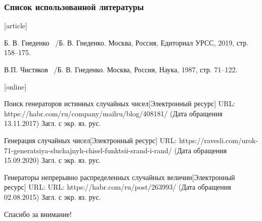 \documentclass{beamer}
\begin{document}
\begin{frame}[t]
\frametitle{Список использованной литературы}
\tiny
\begin{thebibliography}{9}
[article]

{Б. В. Гнеденко}
~/Б. В. Гнеденко.
\newblock Москва, Россия, Едиториал УРСС, 2019, стр. 158--175.

{В.П. Чистяков}
~/Б. В. Гнеденко.
\newblock Москва, Россия, Наука, 1987, стр. 71--122.

[online]

{Поиск генераторов истинных случайных чисел[Электронный ресурс]}
\newblock URL: https://habr.com/ru/company/mailru/blog/408181/
\newblock (Дата обращения 13.11.2017) Загл. с экр. яз. рус.

{Генерация случайных чисел[Электронный ресурс]}
\newblock URL: https://ravesli.com/urok-71-generatsiya-sluchajnyh-chisel-funktsii-srand-i-rand/
\newblock (Дата обращения 15.09.2020) Загл. с экр. яз. рус.

{Генераторы непрерывно распределенных случайных величин[Электронный ресурс]}
\newblock URL: URL: https://habr.com/ru/post/263993/
\newblock (Дата обращения 02.08.2015) Загл. с экр. яз. рус.
\end{thebibliography}
\end{frame}


\begin{frame}
\huge
\begin{center}
Спасибо за внимание!
\end{center}
\end{frame}
\end{document}
